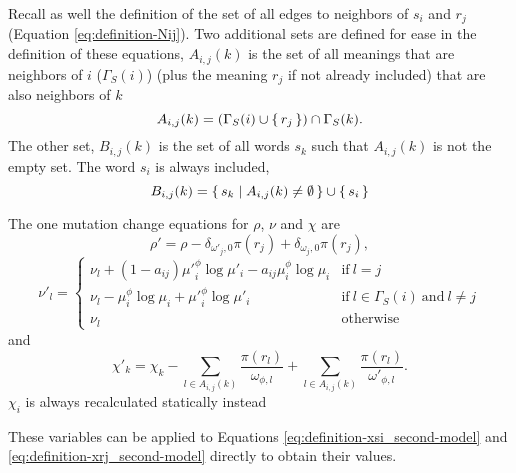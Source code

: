 Recall as well the definition of the set of all edges to neighbors of $s_i$ and $r_j$ (Equation \eqref{eq:definition-Nij}). Two additional sets are defined for ease in the definition of these equations, $A_{i,j}(k)$ is the set of all meanings that are neighbors of $i$ ($\Gamma_S(i)$) (plus the meaning $r_j$ if not already included) that are also neighbors of $k$
\begin{equation}
  \label{eq:definition-A_second-model}
  A_{i,j}(k) = (\Gamma_S(i) \cup \{\,r_j\,\}) \cap \Gamma_S(k).
\end{equation}
The other set, $B_{i,j}(k)$ is the set of all words $s_k$ such that $A_{i,j}(k)$ is not the empty set.
The word $s_i$ is always included,
\begin{equation}
  \label{eq:definition-B_second-model}
  B_{i,j}(k) = \{\,s_k\mid A_{i,j}(k) \neq \emptyset\,\} \cup \{\,s_i\,\}
\end{equation}

The one mutation change equations for $\rho$, $\nu$ and $\chi$ are
\begin{equation}
  \label{eq:definition-rho_dynamic}
  \rho' = \rho - \delta_{\omega'_j,0} \pi(r_j) + \delta_{\omega_j,0} \pi(r_j),
\end{equation}
\begin{equation}
  \label{eq:definition-nu_dynamic}
  \nu'_l = \begin{cases}
    \nu_l + (1 - a_{ij}) {\mu'}_i^\phi \log \mu'_i - a_{ij}\mu_i^\phi \log \mu_i & \text{if}~l=j \\
    \nu_l - \mu_i^\phi \log \mu_i + {\mu'}_i^\phi \log \mu'_i & \text{if}~l\in \Gamma_S(i)~\text{and}~ l \neq j \\
    \nu_l & \text{otherwise}
  \end{cases}
\end{equation}
and
\begin{equation}
  \label{eq:definition-chi_dynamic}
  \chi'_k = \chi_k - \sum_{l \in A_{i,j}(k)} \frac{\pi(r_l)}{\omega_{\phi,l}} + \sum_{l \in A_{i,j}(k)} \frac{\pi(r_l)}{\omega'_{\phi,l}}.
\end{equation}
$\chi_i$ is always recalculated statically instead

These variables can be applied to Equations \eqref{eq:definition-xsi_second-model} and \eqref{eq:definition-xrj_second-model} directly to obtain their values.


